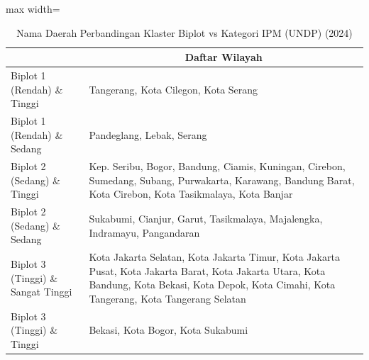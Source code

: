 \begin{table}[H]
\centering
\caption{Nama Daerah Perbandingan Klaster Biplot vs Kategori IPM (UNDP) (2024)} \label{tab:app1crossname2024}
\begin{adjustbox}{max width=\textwidth}
\begin{tabular}{|>{\centering\arraybackslash}p{4cm}|p{10cm}|}
\hline
\multicolumn{1}{|c|}{\textbf{Kategori}} & \multicolumn{1}{c|}{\textbf{Daftar Wilayah}} \\
\hline
Biplot 1 (Rendah) \& Tinggi & Tangerang, Kota Cilegon, Kota Serang \\
\hline
Biplot 1 (Rendah) \& Sedang & Pandeglang, Lebak, Serang \\
\hline
Biplot 2 (Sedang) \& Tinggi & Kep. Seribu, Bogor, Bandung, Ciamis, Kuningan, Cirebon, Sumedang, Subang, Purwakarta, Karawang, Bandung Barat, Kota Cirebon, Kota Tasikmalaya, Kota Banjar \\
\hline
Biplot 2 (Sedang) \& Sedang & Sukabumi, Cianjur, Garut, Tasikmalaya, Majalengka, Indramayu, Pangandaran \\
\hline
Biplot 3 (Tinggi) \& Sangat Tinggi & Kota Jakarta Selatan, Kota Jakarta Timur, Kota Jakarta Pusat, Kota Jakarta Barat, Kota Jakarta Utara, Kota Bandung, Kota Bekasi, Kota Depok, Kota Cimahi, Kota Tangerang, Kota Tangerang Selatan \\
\hline
Biplot 3 (Tinggi) \& Tinggi & Bekasi, Kota Bogor, Kota Sukabumi \\
\hline
\end{tabular}
\end{adjustbox}
\end{table}